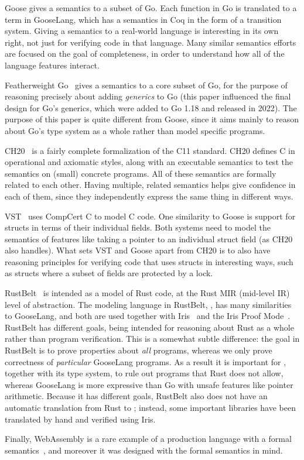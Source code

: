 Goose gives a semantics to a subset of Go. Each function in Go is translated to
a term in GooseLang, which has a semantics in Coq in the form of a transition
system. Giving a semantics to a real-world language is interesting in its own
right, not just for verifying code in that language. Many similar semantics
efforts are focused on the goal of completeness, in order to understand how all
of the language features interact.

Featherweight Go~\cite{griesemer:featherweight-go} gives a semantics to a core
subset of Go, for the purpose of reasoning precisely about adding
\emph{generics} to Go (this paper influenced the final design for Go's generics,
which were added to Go 1.18 and released in 2022). The purpose of this paper is
quite different from Goose, since it aims mainly to reason about Go's type
system as a whole rather than model specific programs.

CH20~\cite{krebbers:c-coq} is a fairly complete formalization of the C11 standard.
CH20 defines C in operational and axiomatic styles, along with an executable
semantics to test the semantics on (small) concrete programs. All of these
semantics are formally related to each other. Having multiple, related semantics
helps give confidence in each of them, since they independently express the same
thing in different ways.

VST~\cite{cao:vst-floyd} uses CompCert C to model C code. One similarity to
Goose is support for structs in terms of their individual fields. Both systems
need to model the semantics of features like taking a pointer to an individual
struct field (as CH20 also handles). What sets VST and Goose apart from CH20 is
to also have reasoning principles for verifying code that uses structs in
interesting ways, such as structs where a subset of fields are protected by a
lock.

RustBelt~\cite{jung:rustbelt} is intended as a model of Rust code, at the Rust
MIR (mid-level IR) level of abstraction. The modeling language in RustBelt,
\lambdarust, has many similarities to GooseLang, and both are used together with
Iris~\cite{jung:iris-1} and the Iris Proof Mode~\cite{krebbers:ipm}. RustBelt
has different goals, being intended for reasoning about Rust as a whole rather
than program verification. This is a somewhat subtle difference: the goal in
RustBelt is to prove properties about \emph{all} \lambdarust programs, whereas
we only prove correctness of \emph{particular} GooseLang programs. As a result
it is important for \lambdarust, together with its type system, to rule out
programs that Rust does not allow, whereas GooseLang is more expressive than Go
with unsafe features like pointer arithmetic. Because it has different goals, RustBelt
also does not have an automatic translation from Rust to \lambdarust; instead,
some important libraries have been translated by hand and verified using Iris.

Finally, WebAssembly is a rare example of a production language with a formal
semantics~\cite{haas:wasm}, and moreover it was designed with the formal
semantics in mind.
